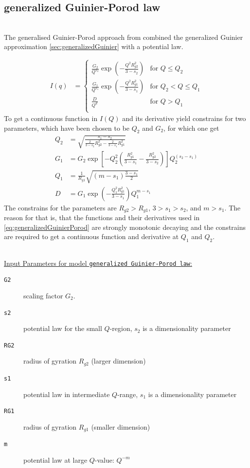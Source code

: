 \clearpage
\subsection{generalized Guinier-Porod law}
\label{sec:generalizedGuinierPorodLaw}  ~\\

The generalised Guinier-Porod approach from \cite{Hammouda2010} combined the  generalized Guinier approximation \ref{sec:generalizedGuinier} with a potential law.

\begin{align}
I(q) &=
\begin{cases}
  \frac{G_2}{Q^{s_2}} \exp\left(-\frac{Q^2R^2_{g2}}{3-s_2}\right)& \mbox{for } Q \leq Q_2\\
  \frac{G_1}{Q^{s_1}} \exp\left(-\frac{Q^2R^2_{g1}}{3-s_1}\right)& \mbox{for } Q_2 < Q\leq Q_1\\
  \frac{D}{Q^d} & \mbox{for } Q > Q_1 \\
\end{cases}
\label{eq:generalizedGuinierPorod}
\end{align}
To get a continuous function in $I(Q)$ and its derivative yield constrains for two parameters, which have been chosen to be $Q_2$ and $G_2$, for which one get
\begin{align}
Q_2 &= \sqrt{\frac{s_1-s_2}{\frac{2}{3-s_2}R^2_{g2}-\frac{2}{3-s_1}R^2_{g1}}}\\
G_1 &= G_2 \exp\left[-Q_2^2\left(\frac{R^2_{g1}}{3-s_1}-\frac{R_{g2}^2}{3-s_2}\right)\right] Q_2^{(s_2-s_1)} \\
Q_1 &= \frac{1}{R_{g1}}\sqrt{\left(m-s_1\right)\frac{3-s_1}{2}} \\
D   &= G_1 \exp\left(-\frac{Q_1^2 R_{g1}^2}{3-s_1}\right) Q_1^{m-s_1}
\label{eq:generalizedGuinierPorodConstrains}
\end{align}
The constrains for the parameters are $R_{g2}>R_{g1}$, $3>s_1>s_2$, and $m>s_1$. The reason for that is, that the functions and their derivatives used in \ref{eq:generalizedGuinierPorod} are strongly monotonic decaying and the constrains are required to get a continuous function and derivative at $Q_1$ and $Q_2$.

\hspace{1pt}\\
\underline{Input Parameters for model \texttt{generalized Guinier-Porod law}:}\\
\begin{description}
\item[\texttt{G2}] scaling factor $G_2$.
\item[\texttt{s2}] potential law for the small $Q$-region, $s_2$ is a dimensionality parameter
\item[\texttt{RG2}] radius of gyration $R_{g2}$ (larger dimension)
\item[\texttt{s1}] potential law in intermediate $Q$-range, $s_1$ is a dimensionality parameter
\item[\texttt{RG1}] radius of gyration $R_{g1}$ (smaller dimension)
\item[\texttt{m}] potential law at large $Q$-value: $Q^{-m}$
\end{description}

